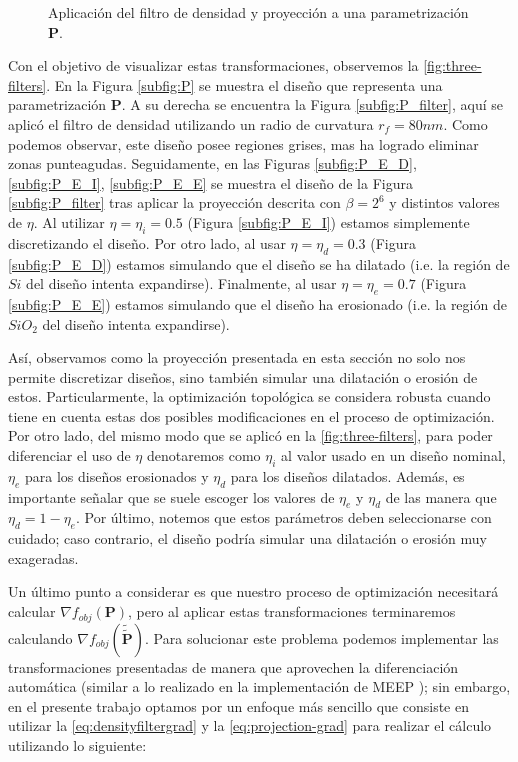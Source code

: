 \begin{figure}[ht]
  \caption{Aplicación del filtro de densidad y proyección a una parametrización $\boldsymbol{P}.$}
  \label{fig:three-filters}
\end{figure}

Con el objetivo de visualizar estas transformaciones, observemos la \autoref{fig:three-filters}.
En la Figura \autoref{subfig:P} se muestra el diseño que representa una parametrización $\boldsymbol{P}$.
A su derecha se encuentra la Figura \autoref{subfig:P_filter}, aquí se aplicó el filtro de densidad
utilizando un radio de curvatura $r_f = 80 nm$. Como podemos observar, este diseño posee regiones grises,
mas ha logrado eliminar zonas punteagudas.
Seguidamente, en las Figuras \autoref{subfig:P_E_D}, \autoref{subfig:P_E_I}, \autoref{subfig:P_E_E}
se muestra el diseño de la Figura \autoref{subfig:P_filter} tras aplicar la proyección descrita con
$\beta = 2^6$ y distintos valores de $\eta$.
Al utilizar $\eta = \eta_i = 0.5$ (Figura \autoref{subfig:P_E_I}) 
estamos simplemente discretizando el diseño.
Por otro lado, al usar $\eta = \eta_d = 0.3$ (Figura \autoref{subfig:P_E_D})
estamos simulando que el diseño se ha dilatado 
(i.e. la región de $Si$ del diseño intenta expandirse).
Finalmente, al usar $\eta = \eta_e = 0.7$ (Figura \autoref{subfig:P_E_E})
estamos simulando que el diseño ha erosionado 
(i.e. la región de $SiO_2$ del diseño intenta expandirse).


Así, observamos como la proyección presentada en esta sección no solo nos permite discretizar diseños,
sino también simular una dilatación o erosión de estos.
Particularmente, la optimización topológica se considera robusta cuando
tiene en cuenta estas dos posibles modificaciones en el proceso de optimización.
Por otro lado, del mismo modo que se aplicó en la \autoref{fig:three-filters}, para poder diferenciar 
el uso de $\eta$ denotaremos como $\eta_i$ al valor usado en un diseño nominal, 
$\eta_e$ para los diseños erosionados y $\eta_d$ para los diseños dilatados.
Además, es importante señalar que se suele escoger los valores de $\eta_e$ y $\eta_d$
de las manera que $\eta_d = 1 - \eta_e$.
Por último, notemos que  estos parámetros deben seleccionarse con cuidado; 
caso contrario, el diseño podría simular una dilatación o erosión muy exageradas.

Un último punto a considerar es que nuestro proceso de optimización necesitará calcular 
$\nabla f_{obj}(\boldsymbol{P})$, pero al aplicar estas transformaciones terminaremos calculando
$\nabla f_{obj}(\widetilde{\widetilde{\boldsymbol{P}}})$.
Para solucionar este problema podemos implementar las transformaciones presentadas 
de manera que aprovechen la diferenciación automática (similar a lo realizado en la implementación
de MEEP \citep{Oskooi2010}); sin embargo, en el presente trabajo optamos por un enfoque más sencillo
que consiste en utilizar la \autoref{eq:densityfiltergrad} y la \autoref{eq:projection-grad} 
para realizar el cálculo utilizando lo siguiente:


